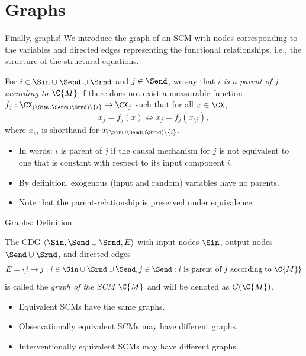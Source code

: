 \part{Graphs}
\frame{\partpage}

\begin{frame}{Finally, graphs!}
  We introduce the graph of an SCM with nodes corresponding to the variables and directed edges representing the functional relationships, i.e., the structure of the structural equations.
  
  \begin{Def}
  For $i \in \Sin \cup \Send \cup \Srnd$ and $j \in \Send$, we say that
  \emph{$i$ is a parent of $j$ according to $\C{M}$} if there does not exist a measurable function
  $\tilde f_j : \CX_{(\Sin\cup\Send\cup\Srnd) \setminus \{i\}} \to \CX_j$
  such that for all $x \in \CX$,
  $$x_j = f_j(x) \iff x_j = \tilde f_j(x_{\setminus i}),$$
  where $x_{\setminus i}$ is shorthand for $x_{(\Sin\cup\Send\cup\Srnd)\setminus\{i\}}$.
\end{Def}
  \begin{itemize}
    \item In words: $i$ is parent of $j$ if the causal mechanism for $j$ is not equivalent to one that is constant with respect to its input component $i$.
    \item By definition, exogenous (input and random) variables have no parents.
    \item Note that the parent-relationship is preserved under equivalence.
  \end{itemize}
\end{frame}

\begin{frame}{Graphs: Definition}
  \begin{Def}
  The CDG $\langle \Sin, \Send \cup \Srnd, E \rangle$ with
  input nodes $\Sin$, output nodes $\Send\cup\Srnd$, and
  directed edges
  $$E = \{i \to j : i \in \Sin\cup\Srnd\cup\Send, j\in\Send: \text{$i$ is parent of $j$ according to $\C{M}$}\}$$
  is called the \emph{graph of the SCM $\C{M}$} and will be denoted as $G(\C{M})$.
\end{Def}
  \begin{itemize}
    \item Equivalent SCMs have the same graphs.
    \item Observationally equivalent SCMs may have different graphs.
    \item Interventionally equivalent SCMs may have different graphs.
  \end{itemize}
\end{frame}


